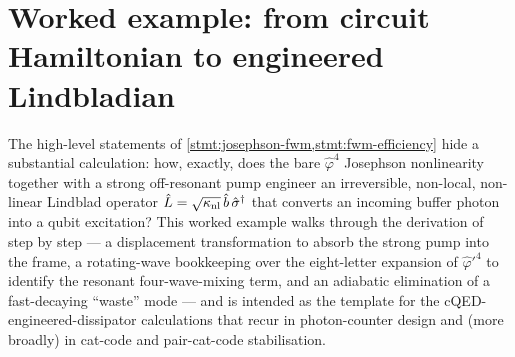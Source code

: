 \section{Worked example: from circuit Hamiltonian to engineered Lindbladian}
\label{sec:lescanne-derivation}

\begin{example}
\label{ex:lescanne-smpd}
The high-level statements of \cref{stmt:josephson-fwm,stmt:fwm-efficiency}
hide a substantial calculation: how, exactly, does the bare $\hat\varphi^4$
Josephson nonlinearity together with a strong off-resonant pump engineer
an irreversible, non-local, non-linear Lindblad operator
$\hat{L}=\sqrt{\kappa_{\rm nl}}\,\hat b\,\hat\sigma^\dagger$ that converts an
incoming buffer photon into a qubit excitation? This worked example
walks through the derivation of \cite{lescanne2020} step by step --- a
displacement transformation to absorb the strong pump into the frame, a
rotating-wave bookkeeping over the eight-letter expansion of $\hat\varphi'^4$
to identify the resonant four-wave-mixing term, and an adiabatic
elimination of a fast-decaying ``waste'' mode --- and is intended as the
template for the cQED-engineered-dissipator calculations that recur in
photon-counter design and (more broadly) in cat-code and pair-cat-code
stabilisation.
\end{example}

